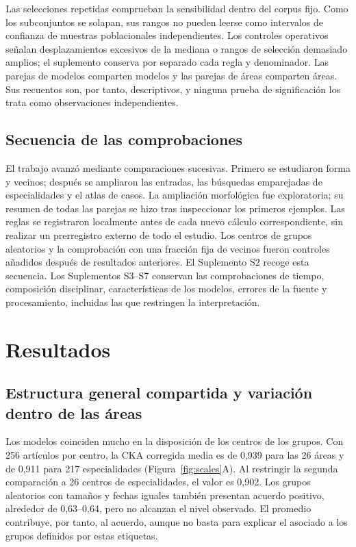 \documentclass[12pt]{article}
\begin{document}
Las selecciones repetidas comprueban la sensibilidad dentro del corpus fijo. Como los subconjuntos se solapan, sus rangos no pueden leerse como intervalos de confianza de muestras poblacionales independientes. Los controles operativos señalan desplazamientos excesivos de la mediana o rangos de selección demasiado amplios; el suplemento conserva por separado cada regla y denominador. Las parejas de modelos comparten modelos y las parejas de áreas comparten áreas. Sus recuentos son, por tanto, descriptivos, y ninguna prueba de significación los trata como observaciones independientes.

\subsection{Secuencia de las comprobaciones}
El trabajo avanzó mediante comparaciones sucesivas. Primero se estudiaron forma y vecinos; después se ampliaron las entradas, las búsquedas emparejadas de especialidades y el atlas de casos. La ampliación morfológica fue exploratoria; su resumen de todas las parejas se hizo tras inspeccionar los primeros ejemplos. Las reglas se registraron localmente antes de cada nuevo cálculo correspondiente, sin realizar un prerregistro externo de todo el estudio. Los centros de grupos aleatorios y la comprobación con una fracción fija de vecinos fueron controles añadidos después de resultados anteriores. El Suplemento S2 recoge esta secuencia. Los Suplementos S3--S7 conservan las comprobaciones de tiempo, composición disciplinar, características de los modelos, errores de la fuente y procesamiento, incluidas las que restringen la interpretación.

\section{Resultados}
\subsection{Estructura general compartida y variación dentro de las áreas}
Los modelos coinciden mucho en la disposición de los centros de los grupos. Con 256 artículos por centro, la CKA corregida media es de 0,939 para las 26 áreas y de 0,911 para 217 especialidades (Figura~\ref{fig:scales}A). Al restringir la segunda comparación a 26 centros de especialidades, el valor es 0,902. Los grupos aleatorios con tamaños y fechas iguales también presentan acuerdo positivo, alrededor de 0,63--0,64, pero no alcanzan el nivel observado. El promedio contribuye, por tanto, al acuerdo, aunque no basta para explicar el asociado a los grupos definidos por estas etiquetas.
\end{document}
